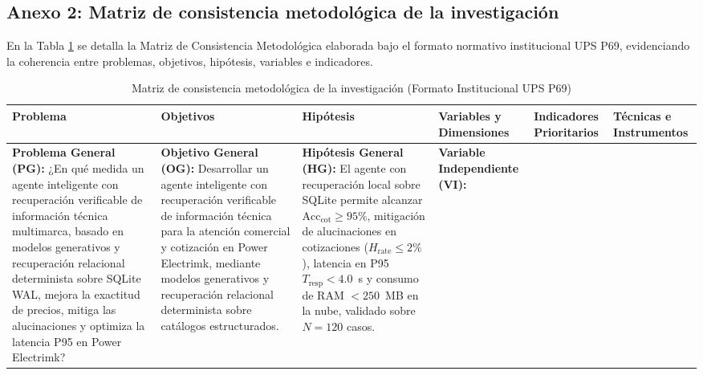 \subsection{Anexo 2: Matriz de consistencia metodológica de la investigación}

En la Tabla \ref{tab:matriz_consistencia} se detalla la Matriz de Consistencia Metodológica elaborada bajo el formato normativo institucional UPS P69, evidenciando la coherencia entre problemas, objetivos, hipótesis, variables e indicadores.

\begin{landscape}
\begin{table}[H]
\centering
\caption{Matriz de consistencia metodológica de la investigación (Formato Institucional UPS P69)}
\label{tab:matriz_consistencia}
\singlespacing
\fontsize{6.5pt}{7.6pt}\selectfont
\renewcommand{\arraystretch}{0.82}
\setlength{\tabcolsep}{3.5pt}
\begin{tabular}{p{3.8cm} p{3.8cm} p{3.8cm} p{3.0cm} p{3.0cm} p{3.0cm}}
\toprule
\textbf{Problema} & \textbf{Objetivos} & \textbf{Hipótesis} & \textbf{Variables y Dimensiones} & \textbf{Indicadores Prioritarios} & \textbf{Técnicas e Instrumentos} \\
\midrule
\textbf{Problema General (PG):} \newline
¿En qué medida un agente inteligente con recuperación verificable de información técnica multimarca, basado en modelos generativos y recuperación relacional determinista sobre SQLite WAL, mejora la exactitud de precios, mitiga las alucinaciones y optimiza la latencia P95 en Power Electrimk? &
\textbf{Objetivo General (OG):} \newline
Desarrollar un agente inteligente con recuperación verificable de información técnica para la atención comercial y cotización en Power Electrimk, mediante modelos generativos y recuperación relacional determinista sobre catálogos estructurados. &
\textbf{Hipótesis General (HG):} \newline
El agente con recuperación local sobre SQLite permite alcanzar $\text{Acc}_{\text{cot}} \ge 95\%$, mitigación de alucinaciones en cotizaciones ($H_{\text{rate}} \le 2\%$), latencia en P95 $T_{\text{resp}} < 4.0$~s y consumo de RAM $< 250$~MB en la nube, validado sobre $N=120$ casos. &
\textbf{Variable Independiente (VI):} \newline

\end{tabular}
\end{table}
\end{landscape}
